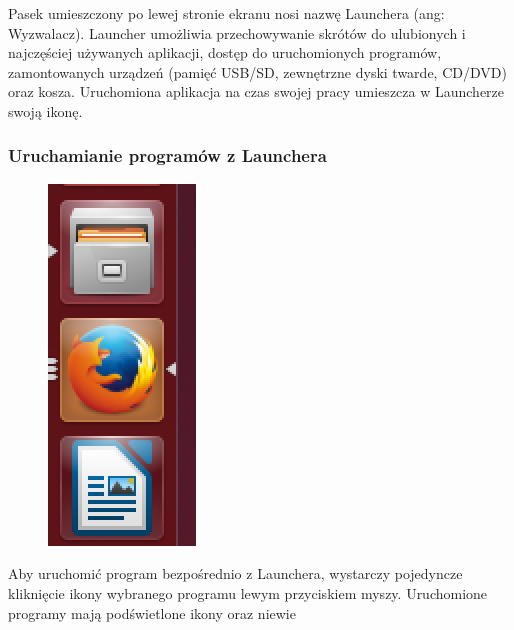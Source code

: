Pasek umieszczony po lewej stronie ekranu nosi nazwę Launchera (ang: \textcolor{ubuntu_orange}{Wyzwalacz}). Launcher umożliwia przechowywanie skrótów do ulubionych i najczęściej używanych aplikacji, dostęp do uruchomionych programów, zamontowanych urządzeń (pamięć USB/SD, zewnętrzne dyski twarde, CD/DVD) oraz kosza. Uruchomiona aplikacja na czas swojej pracy umieszcza w Launcherze swoją ikonę.

\subsubsection{Uruchamianie programów z Launchera}
\begin{figure}
	\vspace{-10pt}
	\includegraphics[width=\linewidth]{images/unity_launcher_programy.png}
\end{figure}

Aby uruchomić program bezpośrednio z Launchera, wystarczy pojedyncze kliknięcie ikony wybranego programu lewym przyciskiem myszy. Uruchomione programy mają podświetlone ikony oraz niewie